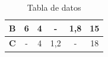\documentclass[../main.tex]{subfiles}
\begin{document}
\begin{exercise}
\begin{table}[ht]
\begin{tabular}{|c|cc|cc|c|}
                \textbf{B}                                                                           & \multicolumn{1}{c|}{6}                                         & 4                                         & \multicolumn{1}{c|}{-}                                            & 1,8                                       & 15                                                                                                     \\ \hline
                \textbf{C}                                                                           & \multicolumn{1}{c|}{-}                                         & 4                                         & \multicolumn{1}{c|}{1,2}                                          & -                                         & 18                                                                                                     \\ \hline
                \end{tabular}
                \caption{Tabla de datos}
            \end{table}


\end{exercise}
\end{document}
